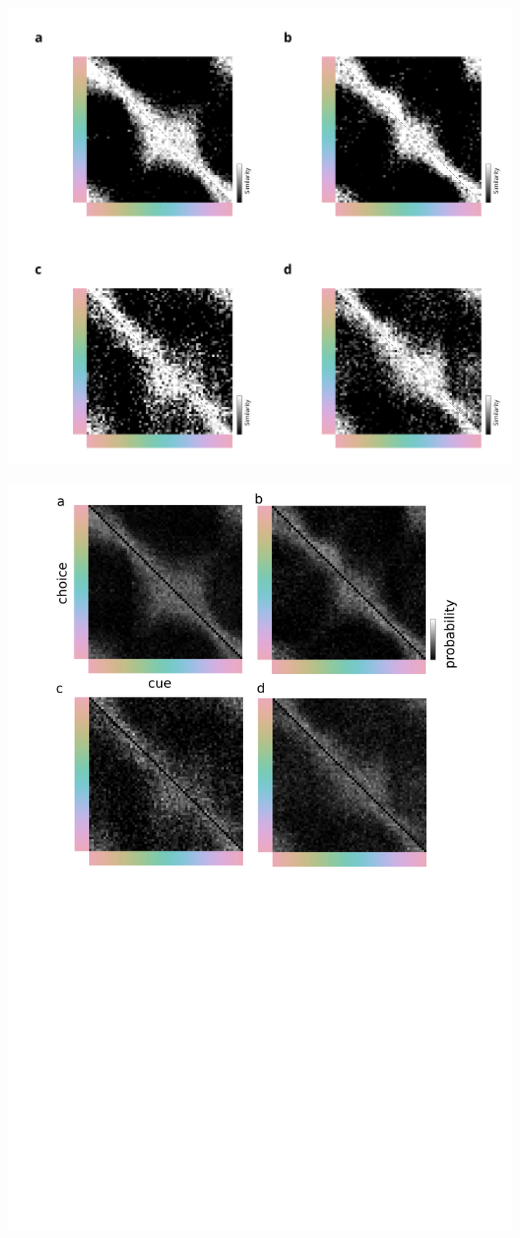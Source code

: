 \begin{appendixbox}
        \includegraphics[width=\textwidth]{../Figures/flat/SI5_IndTCCv.jpg}
        \label{fig:IndiTCC}
\end{appendixbox}

\begin{appendixbox}
        \includegraphics[width=\textwidth]{../Figures/flat/SI6_choiceMatrices.jpg}
        \label{fig:choiceProbabilityMatrices}
\end{appendixbox}

